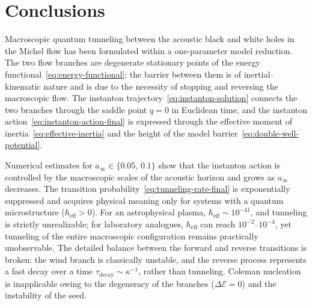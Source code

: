\documentclass[12pt,a4paper,preprint]{elsarticle}
\begin{document}
    \section{Conclusions}\label{sec:conclusions}
        Macroscopic quantum tunneling between the acoustic black and white holes in the Michel flow has been formulated within a one-parameter model reduction. The two flow branches are degenerate stationary points of the energy functional~\eqref{eq:energy-functional}; the barrier between them is of inertial--kinematic nature and is due to the necessity of stopping and reversing the macroscopic flow. The instanton trajectory~\eqref{eq:instanton-solution} connects the two branches through the saddle point $q = 0$ in Euclidean time, and the instanton action~\eqref{eq:instanton-action-final} is expressed through the effective moment of inertia~\eqref{eq:effective-inertia} and the height of the model barrier~\eqref{eq:double-well-potential}.
        
        Numerical estimates for $a_{\infty} \in \{0.05,\, 0.1\}$ show that the instanton action is controlled by the macroscopic scales of the acoustic horizon and grows as $a_{\infty}$ decreases. The transition probability~\eqref{eq:tunneling-rate-final} is exponentially suppressed and acquires physical meaning only for systems with a quantum microstructure ($\hbar_{\mathrm{eff}} > 0$). For an astrophysical plasma, $\hbar_{\mathrm{eff}} \sim 10^{-41}$, and tunneling is strictly unrealizable; for laboratory analogues, $\hbar_{\mathrm{eff}}$ can reach $10^{-2}$--$10^{-4}$, yet tunneling of the entire macroscopic configuration remains practically unobservable. The detailed balance between the forward and reverse transitions is broken: the wind branch is classically unstable, and the reverse process represents a fast decay over a time $\tau_{\mathrm{decay}} \sim \kappa^{-1}$, rather than tunneling. Coleman nucleation is inapplicable owing to the degeneracy of the branches ($\Delta\mathcal{E} = 0$) and the instability of the seed.
        
\end{document}
